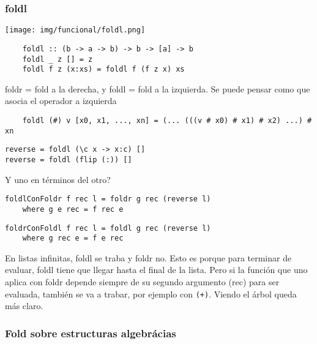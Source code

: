 \documentclass{report}
\theoremstyle{definition} %
\begin{document}
\subsubsection{foldl}

\begin{center}
    \texttt{[image: img/funcional/foldl.png]}
\end{center}

\begin{verbatim}
    foldl :: (b -> a -> b) -> b -> [a] -> b
    foldl _ z [] = z
    foldl f z (x:xs) = foldl f (f z x) xs
\end{verbatim}

foldr = fold a la derecha, y foldl = fold a la izquierda.
Se puede pensar como que asocia el operador a izquierda

\begin{verbatim}
    foldl (#) v [x0, x1, ..., xn] = (... (((v # x0) # x1) # x2) ...) # xn
\end{verbatim}


\begin{verbatim}
reverse = foldl (\c x -> x:c) []
reverse = foldl (flip (:)) []
\end{verbatim}

Y uno en términos del otro?

\begin{verbatim}
foldlConFoldr f rec l = foldr g rec (reverse l)
    where g e rec = f rec e
\end{verbatim}

\begin{verbatim}
foldrConFoldl f rec l = foldl g rec (reverse l)
    where g rec e = f e rec
\end{verbatim}

En listas infinitas, foldl se traba y foldr no. Esto es porque para terminar de
evaluar, foldl tiene que llegar hasta el final de la lista. Pero si la función
que uno aplica con foldr depende siempre de su segundo argumento (rec) para ser
evaluada, también se va a trabar, por ejemplo con \texttt{(+)}. Viendo el árbol
queda más claro.

\subsubsection{Fold sobre estructuras algebrácias}
\end{document}
